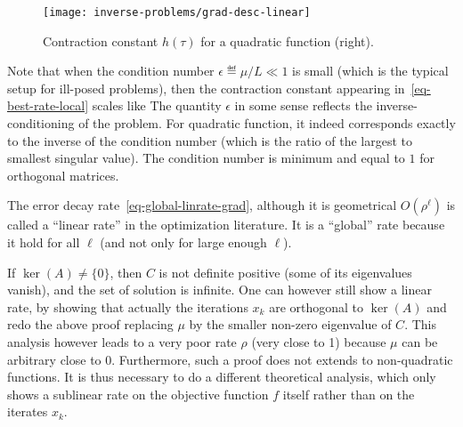 \begin{figure}
\centering
\texttt{[image: inverse-problems/grad-desc-linear]}
\caption{\label{fig-grad-desc-contract}
Contraction constant $h(\tau)$ for a quadratic function (right). 
}
\end{figure}

Note that when the condition number $\epsilon \eqdef \mu/L \ll 1$
is small (which is the typical setup for ill-posed problems), then the contraction constant appearing in~\eqref{eq-best-rate-local} scales like 
%
The quantity $\epsilon$ in some sense reflects the inverse-conditioning of the problem. For quadratic function, it indeed corresponds exactly to the inverse of the condition number (which is the ratio of the largest to smallest singular value). The condition number is minimum and equal to $1$ for orthogonal matrices.

The error decay rate~\eqref{eq-global-linrate-grad}, although it is geometrical $O(\rho^\ell)$ is called a ``linear rate'' in the optimization literature. It is a ``global'' rate because it hold for all $\ell$ (and not only for large enough $\ell$).

If $\ker(A) \neq \{0\}$, then $C$ is not definite positive (some of its eigenvalues vanish), and the set of solution is infinite. 
%
One can however still show a linear rate, by showing that actually the iterations $x_k$ are orthogonal to $\ker(A)$ and redo the above proof replacing $\mu$ by the smaller non-zero eigenvalue of $C$. This analysis however leads to a very poor rate $\rho$ (very close to 1) because $\mu$ can be arbitrary close to 0. Furthermore, such a proof does not extends to non-quadratic functions. It is thus necessary to do a different theoretical analysis, which only shows a sublinear rate on the objective function $f$ itself rather than on the iterates $x_k$.  


